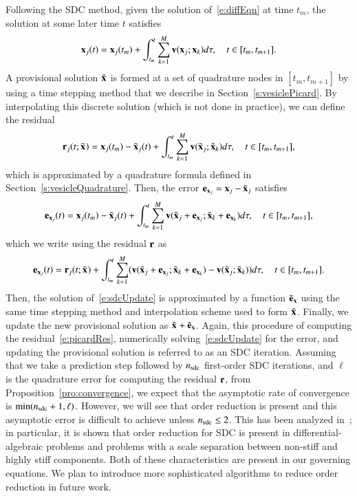 Following the SDC method, given the solution of~\eqref{e:diffEqn} at
time $t_{m}$, the solution at some later time $t$ satisfies
\begin{align}
  {\mathbf{x}}_{j}(t) = {\mathbf{x}}_{j}(t_{m}) + \int_{t_{m}}^{t}
    \sum_{k=1}^{M}{\mathbf{v}}({\mathbf{x}}_{j};{\mathbf{x}}_{k})d\tau, \quad t \in [t_{m},t_{m+1}].
  \label{e:picardEqn}
\end{align}
A provisional solution ${\tilde{{\mathbf{x}}}_{}}$ is formed at a set of quadrature nodes
in $[t_{m},t_{m+1}]$ by using a time stepping method that we describe
in Section~\ref{s:vesiclePicard}.  By interpolating this discrete
solution (which is not done in practice), we can define the residual
\begin{align}
  {\mathbf{r}}_{j}(t;{\tilde{{\mathbf{x}}}_{}}) = {\mathbf{x}}_{j}(t_{m}) - {\tilde{{\mathbf{x}}}_{j}}(t) +
    \int_{t_{m}}^{t} \sum_{k=1}^{M}{\mathbf{v}}({\tilde{{\mathbf{x}}}_{j}};{\tilde{{\mathbf{x}}}_{k}})d\tau,
    \quad t \in [t_{m},t_{m+1}],
  \label{e:picardRes}
\end{align}
which is approximated by a quadrature formula defined in
Section~\ref{s:vesicleQuadrature}.  Then, the error ${\mathbf{e}_{{\mathbf{x}}_{j}}} = {\mathbf{x}}_{j} -
{\tilde{{\mathbf{x}}}_{j}}$ satisfies
\begin{align*}
  {\mathbf{e}_{{\mathbf{x}}_{j}}}(t) = {\mathbf{x}}_{j}(t_{m}) - {\tilde{{\mathbf{x}}}_{j}}(t) + \int_{t_{m}}^{t}
    \sum_{k=1}^{M}{\mathbf{v}}({\tilde{{\mathbf{x}}}_{j}} + {\mathbf{e}_{{\mathbf{x}}_{j}}};{\tilde{{\mathbf{x}}}_{k}} + {\mathbf{e}_{{\mathbf{x}}_{k}}})
    d\tau, \quad t \in [t_{m},t_{m+1}],
\end{align*}
which we write using the residual ${\mathbf{r}}$ as
\begin{align}
  {\mathbf{e}_{{\mathbf{x}}_{j}}}(t) = {\mathbf{r}}_{j}(t;{\tilde{{\mathbf{x}}}_{}}) + \int_{t_{m}}^{t}
  \sum_{k=1}^{M}({\mathbf{v}}({\tilde{{\mathbf{x}}}_{j}}+{\mathbf{e}_{{\mathbf{x}}_{j}}};{\tilde{{\mathbf{x}}}_{k}} + {\mathbf{e}_{{\mathbf{x}}_{k}}}) - 
      {\mathbf{v}}({\tilde{{\mathbf{x}}}_{j}};{\tilde{{\mathbf{x}}}_{k}})) d\tau,
    \quad t \in [t_{m},t_{m+1}].
  \label{e:sdcUpdate}
\end{align}
Then, the solution of~\eqref{e:sdcUpdate} is approximated by a function
$\tilde{{\mathbf{e}}}_{{\mathbf{x}}}$ using the same time stepping method and
interpolation scheme used to form ${\tilde{{\mathbf{x}}}_{}}$.  Finally, we update the new
provisional solution as ${\tilde{{\mathbf{x}}}_{}} + \tilde{{\mathbf{e}}}_{{\mathbf{x}}}$.  Again, this
procedure of computing the residual~\eqref{e:picardRes}, numerically
solving~\eqref{e:sdcUpdate} for the error, and updating the provisional
solution is referred to as an SDC iteration.  Assuming that we take a
prediction step followed by $n_{{\mathrm{sdc}}}$ first-order SDC iterations, and
$\ell$ is the quadrature error for computing the residual ${\mathbf{r}}$, from
Proposition~\ref{pro:convergence}, we expect that the asymptotic rate
of convergence is $\min(n_{{\mathrm{sdc}}}+1,\ell)$.  However, we will see that
order reduction is present and this asymptotic error is difficult to
achieve unless $n_{{\mathrm{sdc}}} \leq 2$.  This has been analyzed
in~\cite{wei2013}; in particular, it is shown that order reduction for
SDC is present in differential-algebraic problems and problems with a
scale separation between non-stiff and highly stiff components.  Both
of these characteristics are present in our governing equations.  We
plan to introduce more sophisticated algorithms to reduce order
reduction in future work.
